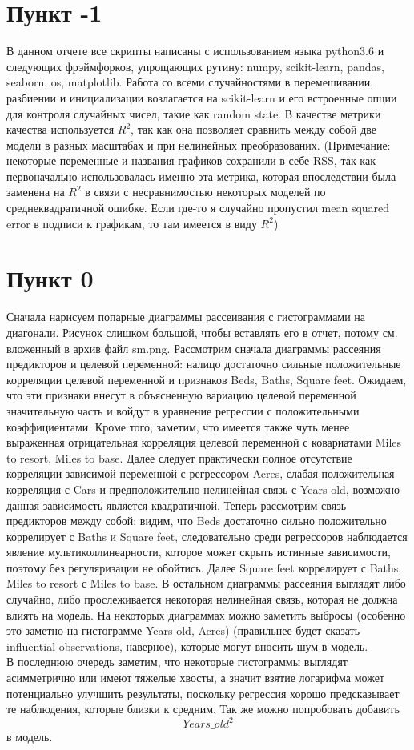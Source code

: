 \documentclass[a4paper, 12pt, oneside]{scrartcl}
\numberwithin{equation}{section}
\numberwithin{table}{section}
\numberwithin{figure}{section}
\begin{document}
\section*{Пункт -1}
В данном отчете все скрипты написаны с использованием языка python3.6 и следующих фрэймфорков, упрощающих рутину: numpy, 
scikit-learn, pandas, seaborn, os, matplotlib. Работа со всеми случайностями в перемешивании, разбиении и инициализации 
возлагается на scikit-learn и его встроенные опции для контроля случайных чисел, такие как random state. В качестве метрики качества 
используется $ R^2 $, так как она позволяет сравнить между собой две модели в разных масштабах и при нелинейных преобразованих.
(Примечание: некоторые переменные и названия графиков сохранили в себе RSS, так как первоначально использовалась именно 
    эта метрика, которая впоследствии была заменена на $ R^2 $ в связи с несравнимостью некоторых моделей по среднеквадратичной 
ошибке. Если где-то я случайно пропустил mean squared error в подписи к графикам, то там имеется в виду $ R^2 $)

\section*{Пункт 0}
Сначала нарисуем попарные диаграммы рассеивания с гистограммами на диагонали. Рисунок слишком большой, чтобы вставлять его в отчет, потому
см. вложенный в архив файл sm.png. Рассмотрим сначала диаграммы рассеяния предикторов и целевой переменной: налицо достаточно сильные 
положительные корреляции целевой переменной и признаков Beds, Baths, Square feet. Ожидаем, что эти признаки внесут в объясненную 
вариацию целевой переменной значительную часть и войдут в уравнение регрессии с положительными коэффициентами. Кроме того, 
заметим, что имеется также чуть менее выраженная отрицательная корреляция целевой переменной с ковариатами Miles to resort, Miles to base.
Далее следует практически полное отсутствие корреляции зависимой переменной с регрессором Acres, слабая положительная корреляция с Cars и
предположительно нелинейная связь с Years old, возможно данная зависимость является квадратичной. Теперь рассмотрим связь предикторов между 
собой: видим, что Beds достаточно сильно положительно коррелирует с Baths и Square feet, следовательно среди регрессоров наблюдается 
явление мультиколлинеарности, которое может скрыть истинные зависимости, поэтому без регуляризации не обойтись. Далее Square feet 
коррелирует с Baths, Miles to resort с Miles to base. В остальном диаграммы рассеяния выглядят либо случайно, либо прослеживается 
некоторая нелинейная связь, которая не должна влиять на модель. На некоторых диаграммах можно заметить выбросы (особенно это заметно 
на гистограмме Years old, Acres)
(правильнее будет сказать influential observations, наверное), которые могут 
вносить шум в модель. \\
В последнюю очередь заметим, что некоторые гистограммы выглядят асимметрично или имеют тяжелые хвосты, а значит взятие логарифма может 
потенциально улучшить результаты, поскольку регрессия хорошо предсказывает те наблюдения, которые близки к средним. Так же можно попробовать 
добавить $$ Years\_old^2  $$ в модель.
\end{document}
